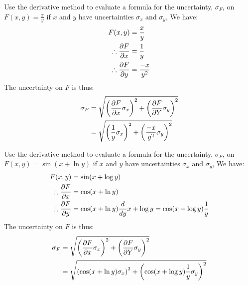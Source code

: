 \begin{example}{}{Use the derivative method to evaluate a formula for the uncertainty, $\sigma_{F}$, on $F(x,y)=\frac{x}{y}$ if $x$ and $y$ have uncertainties $\sigma_{x}$ and $\sigma_{y}$,}{}
We have:
\begin{align*}
F(x,y)&=\frac{x}{y}\\
\therefore \frac{\partial F}{\partial x}&=\frac{1}{y}\\
\therefore \frac{\partial F}{\partial y}&=\frac{-x}{y^2}
\end{align*}
The uncertainty on $F$ is thus:
\begin{align*}
\sigma_{F}&= \sqrt{\left(\frac{\partial F}{\partial x}\sigma_{x}\right)^2 + \left(\frac{\partial F}{\partial Y} \sigma_{y}\right)^2}\\
  &= \sqrt{\left(\frac{1}{y}\sigma_{x}\right)^2 + \left(\frac{-x}{y^2} \sigma_{y}\right)^2}\\
\end{align*}

\end{example}

\begin{example}{}{Use the derivative method to evaluate a formula for the uncertainty, $\sigma_{F}$, on $F(x,y)=\sin(x+\ln y)$ if $x$ and $y$ have uncertainties $\sigma_{x}$ and $\sigma_{y}$,}{}
We have:
\begin{align*}
F(x,y)&=\sin(x+\log y)\\
\therefore \frac{\partial F}{\partial x}&=\cos(x+\ln y)\\
\therefore \frac{\partial F}{\partial y}&=\cos(x+\ln y)\frac{d}{dy}x+\log y=\cos(x+\log y)\frac{1}{y}
\end{align*}
The uncertainty on $F$ is thus:
\begin{align*}
\sigma_{F}&= \sqrt{\left(\frac{\partial F}{\partial x}\sigma_{x}\right)^2 + \left(\frac{\partial F}{\partial Y} \sigma_{y}\right)^2}\\
  &= \sqrt{\left(\cos(x+\ln y)\sigma_{x}\right)^2 + \left(\cos(x+\log y)\frac{1}{y} \sigma_{y}\right)^2}\\
\end{align*}

\end{example}

